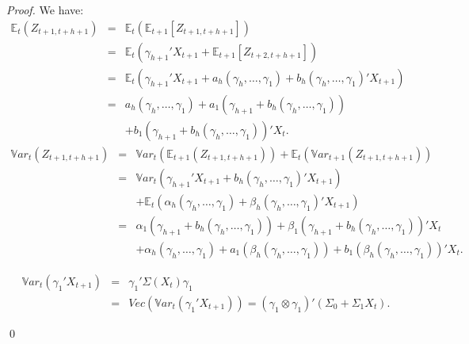 \begin{proof} 
We have:
\begin{eqnarray*}
\mathbb{E}_t(Z_{t+1,t+h+1}) &=&\mathbb{E}_t(\mathbb{E}_{t+1}[Z_{t+1,t+h+1}]) \\
&=& \mathbb{E}_t(\gamma_{h+1}'X_{t+1}+\mathbb{E}_{t+1}[Z_{t+2,t+h+1}])\\
&=& \mathbb{E}_t(\gamma_{h+1}'X_{t+1}+ a_h(\gamma_{h},\dots,\gamma_{1}) + b_h(\gamma_{h},\dots,\gamma_{1})'X_{t+1})\\
&=& a_h(\gamma_{h},\dots,\gamma_{1}) + a_1(\gamma_{h+1}+b_h(\gamma_{h},\dots,\gamma_{1}))\\
&&+ b_1(\gamma_{h+1}+b_h(\gamma_{h},\dots,\gamma_{1}))'X_t.
\end{eqnarray*}
\begin{eqnarray*}
\mathbb{V}ar_t(Z_{t+1,t+h+1}) &=& \mathbb{V}ar_t(\mathbb{E}_{t+1}(Z_{t+1,t+h+1})) + \mathbb{E}_t(\mathbb{V}ar_{t+1}(Z_{t+1,t+h+1}))\\
&=& \mathbb{V}ar_t(\gamma_{h+1}'X_{t+1} + b_h(\gamma_{h},\dots,\gamma_{1})'X_{t+1})\\
&& + \mathbb{E}_t(\alpha_{h}(\gamma_{h},\dots,\gamma_{1}) + \beta_h(\gamma_{h},\dots,\gamma_{1})'X_{t+1})\\
&=& \alpha_1(\gamma_{h+1}+b_h(\gamma_{h},\dots,\gamma_{1})) + \beta_1(\gamma_{h+1}+b_h(\gamma_{h},\dots,\gamma_{1}))'X_t\\
&&+\alpha_{h}(\gamma_{h},\dots,\gamma_{1}) + a_1(\beta_h(\gamma_{h},\dots,\gamma_{1})) + b_1(\beta_h(\gamma_{h},\dots,\gamma_{1}))'X_t.
\end{eqnarray*}

\begin{eqnarray*}
\mathbb{V}ar_t(\gamma_1'X_{t+1}) &=& \gamma_1' \Sigma(X_t) \gamma_1\\
&=& Vec(\mathbb{V}ar_t(\gamma_1'X_{t+1})) = (\gamma_1 \otimes \gamma_1)' (\Sigma_0 + \Sigma_1 X_t).
\end{eqnarray*}

\qed
\end{proof}




\label{app:fama70}

